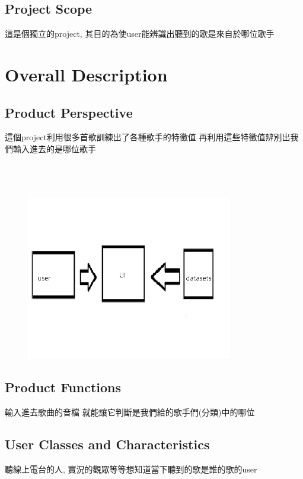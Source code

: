 \documentclass{article}
\begin{document}
\begin{CJK}{UTF8}{bkai}
\subsection{Project Scope\\}
這是個獨立的project, 
其目的為使user能辨識出聽到的歌是來自於哪位歌手

\newpage


\section{\huge\bf \color{blue}  Overall Description\\}

\subsection{\Large Product Perspective\\}
 \large 這個project利用很多首歌訓練出了各種歌手的特徵值 再利用這些特徵值辨別出我們輸入進去的是哪位歌手\\\\\\\\
\begin{figure}[h]
\begin{center}
\includegraphics[width=9cm]{1.png}
\end{center}
\label{fig:1}
\end{figure}
\subsection{\Large Product Functions}
\large 輸入進去歌曲的音檔 就能讓它判斷是我們給的歌手們(分類)中的哪位\\

\subsection{\Large User Classes and Characteristics\\}
  \Large 聽線上電台的人, 實況的觀眾等等想知道當下聽到的歌是誰的歌的user\\\\
\newpage

\end{CJK}
\end{document}
